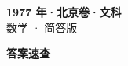 \documentclass[zihao=-4, a4paper]{ctexart}
\begin{document}
\begin{center}
  {\Large\bfseries 1977 年·北京卷·文科}\\[4pt]
  {\large 数学 · 简答版}
\end{center}
\medskip
{}

\clearpage
{}
\begin{center}{\Large\bfseries 答案速查}\end{center}
\medskip

\end{document}
